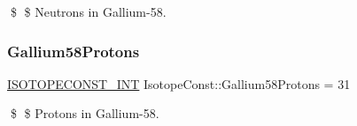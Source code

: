 \$ \$ Neutrons in Gallium-\/58. \mbox{\label{group___isotope_const-_gallium-_ga58_gae416d205665955004d0427132573264b}} 
\subsubsection{\texorpdfstring{Gallium58\+Protons}{Gallium58Protons}}
{\footnotesize\ttfamily \mbox{\hyperlink{group___isotope_const-_macros_ga5f18360b3e99483a35c32d789e62621c}{I\+S\+O\+T\+O\+P\+E\+C\+O\+N\+S\+T\+\_\+\+I\+NT}} Isotope\+Const\+::\+Gallium58\+Protons = 31}

\$ \$ Protons in Gallium-\/58. 